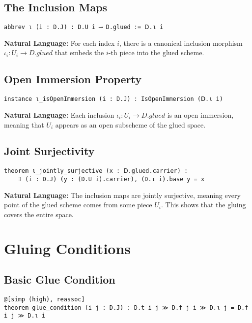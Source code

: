 \documentclass{article}
\theoremstyle{definition}
\begin{document}
\subsection{The Inclusion Maps}

\begin{lstlisting}
abbrev ι (i : D.J) : D.U i ⟶ D.glued := 𝖣.ι i
\end{lstlisting}

\textbf{Natural Language:} For each index $i$, there is a canonical inclusion morphism $\iota_i: U_i \to D.glued$ that embeds the $i$-th piece into the glued scheme.

\subsection{Open Immersion Property}

\begin{lstlisting}
instance ι_isOpenImmersion (i : D.J) : IsOpenImmersion (𝖣.ι i)
\end{lstlisting}

\textbf{Natural Language:} Each inclusion $\iota_i: U_i \to D.glued$ is an open immersion, meaning that $U_i$ appears as an open subscheme of the glued space.

\subsection{Joint Surjectivity}

\begin{lstlisting}
theorem ι_jointly_surjective (x : 𝖣.glued.carrier) :
    ∃ (i : D.J) (y : (D.U i).carrier), (D.ι i).base y = x
\end{lstlisting}

\textbf{Natural Language:} The inclusion maps are jointly surjective, meaning every point of the glued scheme comes from some piece $U_i$. This shows that the gluing covers the entire space.

\section{Gluing Conditions}

\subsection{Basic Glue Condition}

\begin{lstlisting}
@[simp (high), reassoc]
theorem glue_condition (i j : D.J) : D.t i j ≫ D.f j i ≫ D.ι j = D.f i j ≫ D.ι i
\end{lstlisting}
\end{document}
